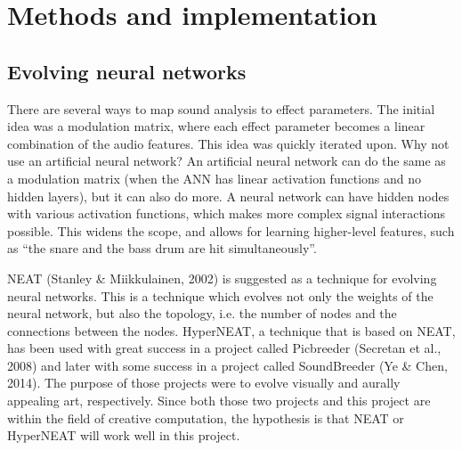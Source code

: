 \chapter{Methods and implementation}

\section{Evolving neural networks}
There are several ways to map sound analysis to effect parameters. The initial idea was a modulation matrix, where each effect parameter becomes a linear combination of the audio features. This idea was quickly iterated upon. Why not use an artificial neural network? An artificial neural network can do the same as a modulation matrix (when the ANN has linear activation functions and no hidden layers), but it can also do more. A neural network can have hidden nodes with various activation functions, which makes more complex signal interactions possible. This widens the scope, and allows for learning higher-level features, such as “the snare and the bass drum are hit simultaneously”.

NEAT (Stanley \& Miikkulainen, 2002) is suggested as a technique for evolving neural networks. This is a technique which evolves not only the weights of the neural network, but also the topology, i.e. the number of nodes and the connections between the nodes. HyperNEAT, a technique that is based on NEAT, has been used with great success in a project called Picbreeder (Secretan et al., 2008) and later with some success in a project called SoundBreeder (Ye \& Chen, 2014). The purpose of those projects were to evolve visually and aurally appealing art, respectively. Since both those two projects and this project are within the field of creative computation, the hypothesis is that NEAT or HyperNEAT will work well in this project.

